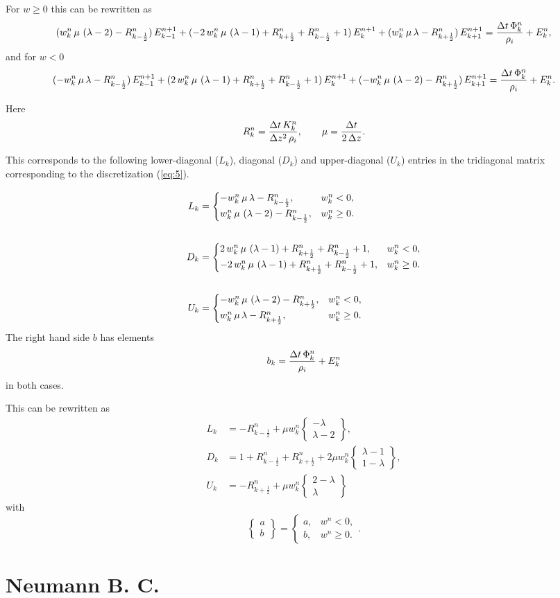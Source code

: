 \documentclass{article}
\newcommand{\wcase}[3]{\begin{cases} #1, & w^{n}_{#3} < 0,\\#2, & w^{n}_{#3} \ge 0.\end{cases}}
\newcommand{\wcaseeq}[4]{#1 &= \wcase{#2}{#3}{#4}}
\begin{document}
For $w \ge 0$ this can be rewritten as
\begin{equation}
  \label{eq:6}
  (w^{n}_{k}\,\mu\,\left(\lambda-2\right)-R^{n}_{k-\frac{1}{2}})\, E^{n+1}_{k-1} + (-2\,w^{n}_{k}\,\mu\,\left(\lambda-1\right)+R^{n}_{k+\frac{1}{2}}+R^{n}_{k-\frac{1}{2}}+1)\, E^{n+1}_{k} + (w^{n}_{k}\,\mu\,\lambda-R^{n}_{k+\frac{1}{2}})\, E^{n+1}_{k+1} = \frac{\Delta t\,\Phi^{n}_{k}}{\rho_{i}}+E^{n}_{k},
\end{equation}
and for $w < 0$
\begin{equation}
  \label{eq:7}
  (-w^{n}_{k}\,\mu\,\lambda-R^{n}_{k-\frac{1}{2}})\, E^{n+1}_{k-1} + (2\,w^{n}_{k}\,\mu\,\left(\lambda-1\right)+R^{n}_{k+\frac{1}{2}}+R^{n}_{k-\frac{1}{2}}+1)\, E^{n+1}_{k} + (-w^{n}_{k}\,\mu\,\left(\lambda-2\right)-R^{n}_{k+\frac{1}{2}})\, E^{n+1}_{k+1} = \frac{\Delta t\,\Phi^{n}_{k}}{\rho_{i}}+E^{n}_{k}.
\end{equation}

Here
\begin{equation}
  R^{n}_{k} = \frac{\Delta t\,K^{n}_{k}}{\Delta z^2\,\rho_{i}},\quad\quad \mu = \frac{\Delta t}{2\,\Delta z}.
\end{equation}

This corresponds to the following lower-diagonal ($L_{k}$), diagonal
($D_{k}$) and upper-diagonal ($U_{k}$) entries in the tridiagonal
matrix corresponding to the discretization (\ref{eq:5}).

\begin{align}
  \wcaseeq{L_{k}}{\Lm}{\Lp}{k}\\
  \notag\\
  \wcaseeq{D_{k}}{\Dm}{\Dp}{k}\\
  \notag\\
  \wcaseeq{U_{k}}{\Um}{\Up}{k}
\end{align}
The right hand side $b$ has elements
\begin{equation}
  \label{eq:8}
  b_{k} = \frac{\Delta t\,\Phi^{n}_{k}}{\rho_{i}}+E^{n}_{k}
\end{equation}
in both cases.

\newcommand{\Rm}{R^{n}_{k-\frac{1}{2}}}
\newcommand{\Rp}{R^{n}_{k+\frac{1}{2}}}
\newcommand{\W}{w^{n}_{k}}
\newcommand{\wstack}[2]{\left\{\begin{matrix}#1\\#2\end{matrix} \right\}}
This can be rewritten as
\begin{align}
  L_{k} &= -\Rm + \mu\W \wstack{-\lambda}{\lambda - 2},\\
  D_{k} &= 1 + \Rm + \Rp + 2\mu\W \wstack{\lambda - 1}{1 - \lambda},\\
  U_{k} &= -\Rp + \mu\W \wstack{2 - \lambda}{\lambda}
\end{align}
with
\begin{equation}
  \label{eq:12}
  \wstack{a}{b} = \wcase{a}{b}{}.
\end{equation}
\section{Neumann B. C.}
\label{sec:neumann-b-c}
\end{document}
